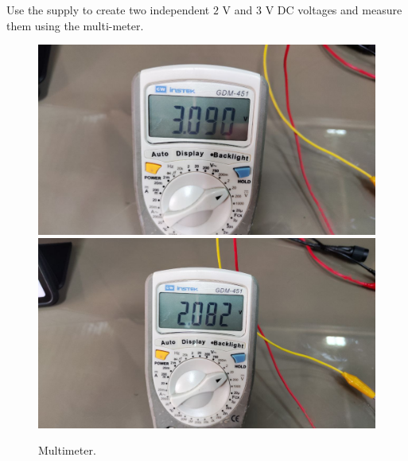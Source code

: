\documentclass[11pt]{article}
\begin{document}
\begin{question}
\begin{subquestion}{Use the supply to create two independent $2$ V and $3$ V DC voltages and measure them using the multi-meter.}
{    \begin{figure}[H]
        \begin{center}
            \includegraphics[scale=0.1]{Fig/39.jpeg}
            \includegraphics[scale=0.1]{Fig/40.jpeg}
            \caption{Multimeter.}
        \end{center}
    \end{figure}
}
\end{subquestion}


\end{question}
\end{document}
